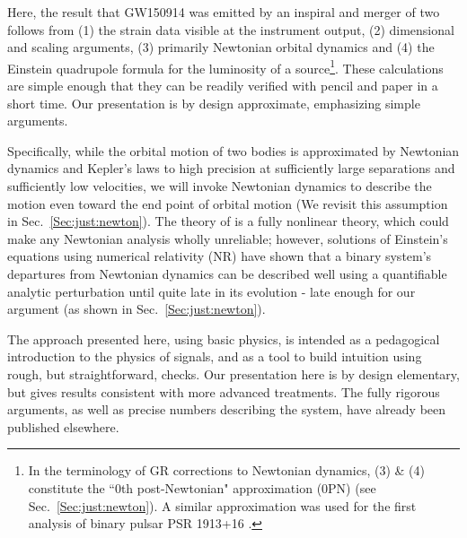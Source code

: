 \documentclass{andp2012}%
\newcommand{\refsec}[1]{Sec.\ \ref{#1}}
\begin{document}
Here, the result that GW150914 was emitted by an inspiral and merger of two \BHs
follows from
(1) the strain data visible at the instrument output,
(2) dimensional and scaling arguments,
(3) primarily Newtonian orbital dynamics and
(4) the Einstein quadrupole formula for the luminosity of a \GW source\footnote{
In the terminology of GR corrections to Newtonian dynamics,
(3) \& (4) constitute the ``0th post-Newtonian" approximation (0PN)
(see \refsec{Sec:just:newton}).
A similar approximation was used for the first analysis of
binary pulsar PSR 1913+16 \cite{Hulse:1974eb, Taylor:1982zz}.
}.
These calculations are simple enough that they can be readily
verified with pencil and paper in a short time.
Our presentation is by design approximate, emphasizing simple arguments.

Specifically, while the orbital motion of two bodies is approximated
by Newtonian dynamics and Kepler's laws
to high precision at sufficiently large separations and sufficiently low velocities,
we will invoke Newtonian dynamics
to describe the motion even toward the end point of orbital motion
(We revisit this assumption in \refsec{Sec:just:newton}).
The theory of \GR
is a fully nonlinear theory,
which could make
any Newtonian analysis
wholly unreliable;
however, solutions of Einstein's equations
using numerical relativity
(NR)\cite{Pretorius:2005gq, Buonanno:2006ui, Boyle:2007ft}
have shown that
a binary system's departures
from Newtonian dynamics
can be described well using
a quantifiable analytic perturbation
until quite late in its evolution
- late enough for our argument
(as shown in \refsec{Sec:just:newton}).

The approach presented here,
using basic physics,
is intended
as a pedagogical introduction to the physics of \GW signals,
and as a tool to build intuition using rough, but straightforward, checks.
Our presentation here is by design elementary,
but gives results consistent with more advanced treatments.
The fully rigorous arguments,
as well as precise numbers describing the system,
have already been published elsewhere\cite{PEPaper, BetterPE, TestingGRPaper, O1BBH, AstroPaper}.
\end{document}
